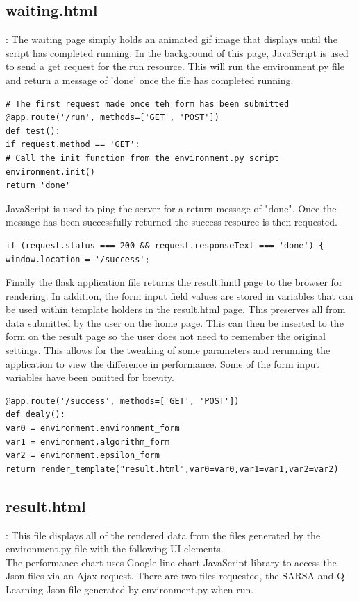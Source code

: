 \subsection{waiting.html}:
The waiting page simply holds an animated gif image that displays until the script has completed running.
In the background of this page, JavaScript is used to send a get request for the run resource. This will run the environment.py file and return a message of 'done' once the file has completed running.
\begin{verbatim}
# The first request made once teh form has been submitted
@app.route('/run', methods=['GET', 'POST'])
def test():
if request.method == 'GET':
# Call the init function from the environment.py script
environment.init()
return 'done'
\end{verbatim}

JavaScript is used to ping the server for a return message of "done". Once the message has been successfully returned the success resource is then requested.
\begin{verbatim}
if (request.status === 200 && request.responseText === 'done') {
window.location = '/success';
\end{verbatim}
Finally the flask application file returns the result.hmtl page to the browser for rendering. In addition, the form input field values are stored in variables that can be used within template holders in the result.html page. This preserves all from data submitted by the user on the home page. This can then be inserted to the form on the result page so the user does not need to remember the original settings. This allows for the tweaking of some parameters and rerunning the application to view the difference in performance. Some of the form input variables have been omitted for brevity.
\begin{verbatim}
@app.route('/success', methods=['GET', 'POST'])
def dealy():
var0 = environment.environment_form
var1 = environment.algorithm_form
var2 = environment.epsilon_form
return render_template("result.html",var0=var0,var1=var1,var2=var2)
\end{verbatim}


\subsection{result.html}: This file displays all of the rendered data from the files generated by the environment.py file with the following UI elements.\\
The performance chart uses Google line chart JavaScript library to access the Json files via an Ajax request. There are two files requested, the SARSA and Q-Learning Json file generated by environment.py when run.
